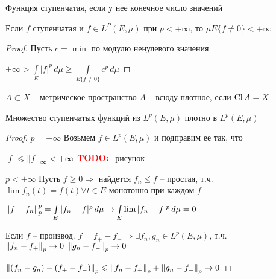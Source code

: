 \begin{definition}\thmslashn
	
	Функция ступенчатая, если у нее конечное число значений
	
\end{definition}

\begin{remark}\thmslashn

	Если $f$ ступенчатая и $f \in L^P(E, \mu)$ при $p < + \infty$, то $\mu E\{f \not = 0\} < +\infty$
	
\end{remark}

\begin{proof}\thmslashn

	Пусть $c = \min$ по модулю ненулевого значения
	
	$+\infty > \int\limits_{E} |f|^p\,d\mu \geqslant \int\limits_{E\{f \not = 0\}} c^p\,d\mu$

\end{proof}

\begin{definition}\thmslashn
	
	$A \subset X$ -- метрическое пространство $A$ -- всюду плотное, если $\operatorname{Cl} A = X$
	
\end{definition}

\begin{theorem}\thmslashn 
	
	Множество ступенчатых функций из $L^p(E, \mu)$ плотно в $L^p(E, \mu)$
	
\end{theorem}

\begin{proof}\thmslashn
	
	$p = +\infty$ Возьмем $f \in L^p(E, \mu)$ и подправим ее так, что 
	
	$|f| \leqslant \left\|f\right\|_\infty < + \infty$ $\TODO$ рисунок
	
	$p < +\infty$ Пусть $f \geqslant 0 \Rightarrow$ найдется $f_n \leqslant f$ -- простая, т.ч. $\lim f_n(t) = f(t) \forall t \in E$ монотонно при каждом $f$
	
	$\left\|f - f_n\right\|_p^p = \int\limits_{E}|f_n - f|^p\,d\mu \to\int\limits_{E}\lim |f_n - f|^p\,d\mu = 0$
	
	Если $f$ -- производ. $f = f_{+} - f_{-} \Rightarrow \exists f_n, g_n \in L^p(E, \mu)$, т.ч. $\left\|f_n - f_{+}\right\|_p \to 0 \,\, \left\|g_n - f_{-}\right\|_p \to 0$
	
	$\left\|(f_n - g_n) - (f_+ - f_-)\right\|_p \leqslant \left\|f_n - f_+\right\|_p + \left\|g_n - f_-\right\|_p \to 0$
	
\end{proof}

